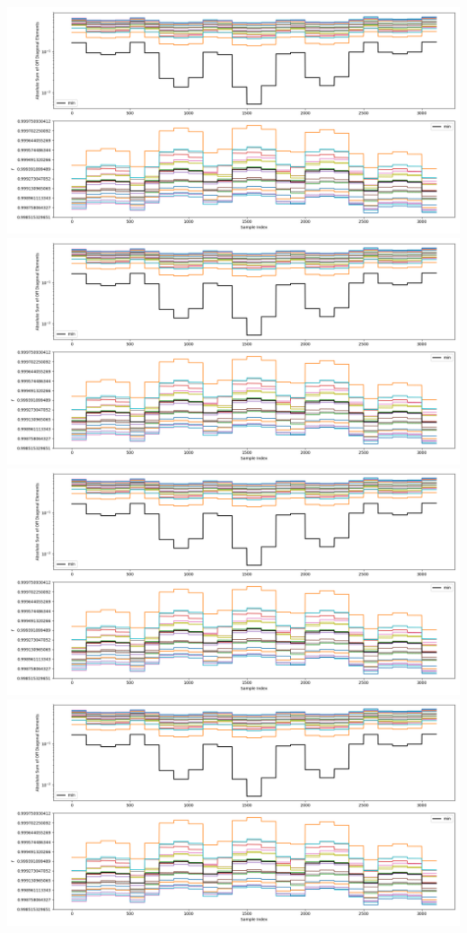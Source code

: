 \documentclass{article}
\begin{document}
\begin{center}
\includegraphics[scale=.9]{report_pickled_controls261/control_dpn_all.png}
\includegraphics[scale=.9]{report_pickled_controls261/control_dpn_all.png}
\includegraphics[scale=.9]{report_pickled_controls261/control_dpn_all.png}
\includegraphics[scale=.9]{report_pickled_controls261/control_dpn_all.png}

\end{center}
\end{document}
